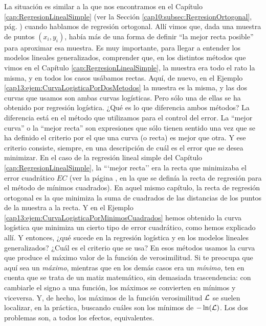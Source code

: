 La situación es similar a la que nos encontramos en el Capítulo \ref{cap:RegresionLinealSimple} (ver la Sección \ref{cap10:subsec:RegresionOrtogonal}, pág. \pageref{cap10:subsec:RegresionOrtogonal}) cuando hablamos de regresión ortogonal. Allí vimos que, dada una muestra de puntos $(x_i, y_i)$, había más de una forma de definir ``la mejor recta posible'' para aproximar esa muestra. Es muy importante, para llegar a entender los modelos lineales generalizados, comprender que, en los distintos métodos que vimos en el Capítulo \ref{cap:RegresionLinealSimple}, la muestra era todo el rato la misma, y en todos los casos usábamos rectas. Aquí, de nuevo, en el Ejemplo \ref{cap13:ejem:CurvaLogisticaPorDosMetodos} la muestra es la misma, y   las dos curvas que usamos son ambas curvas logísticas. Pero sólo una de ellas se ha obtenido por regresión logística. ¿Qué es lo que diferencia ambos métodos? La diferencia está en el método que utilizamos para el control del error. La ``mejor curva'' o la ``mejor recta'' son expresiones que sólo tienen sentido una vez que se ha definido el criterio por el que una curva (o recta) es mejor que otra. Y ese criterio consiste, siempre, en una descripción de cuál es el error que se desea minimizar. En el caso de la regresión lineal simple del Capítulo \ref{cap:RegresionLinealSimple}, la ```mejor recta'' era la recta que minimizaba el error cuadrático $EC$ (ver la página \pageref{cap10:ecu:RectaRegresionFormaPuntoPendiente}, en la que se definía la recta de regresión para el método de mínimos cuadrados). En aquel mismo capítulo, la recta de regresión ortogonal es la que minimiza la suma de cuadrados de las distancias de los puntos de la muestra a la recta. Y en el Ejemplo \ref{cap13:ejem:CurvaLogisticaPorMinimosCuadrados} hemos obtenido la curva logística que minimiza un cierto tipo de error cuadrático, como hemos explicado allí. Y entonces, ¿qué sucede en la regresión logística y en los modelos lineales generalizados? ¿Cuál es el criterio que se usa? En esos métodos usamos la curva que produce el máximo valor de la función de verosimilitud. Si te preocupa que aquí sea un {\em máximo}, mientras que en los demás casos era un {\em mínimo}, ten en cuenta que se trata de un matiz matemático, sin demasiada trascendencia: con cambiarle el signo a una función, los máximos se convierten en mínimos y viceversa. Y, de hecho, los máximos de la función verosimilitud ${\cal L}$ se suelen localizar, en la práctica, buscando cuáles son los mínimos de $-\ln({\cal L})$. Los dos problemas son, a todos los efectos, equivalentes.

